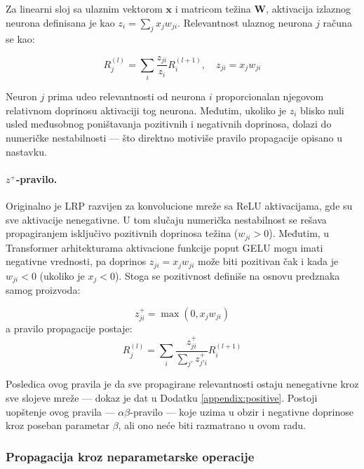 Za linearni sloj sa ulaznim vektorom $\mathbf{x}$ i matricom težina $\mathbf{W}$, 
aktivacija izlaznog neurona definisana je kao $z_i = \sum_j x_j w_{ji}$. 
Relevantnost ulaznog neurona $j$ računa se kao:

\begin{equation}
    R_j^{(l)} = \sum_i \frac{z_{ji}}{z_i} R_i^{(l+1)}, \quad z_{ji} = x_j w_{ji}
    \label{eq:lrp_basic}
\end{equation}

Neuron $j$ prima udeo relevantnosti od neurona $i$ proporcionalan njegovom 
relativnom doprinosu aktivaciji tog neurona. Međutim, ukoliko je $z_i$ blisko 
nuli usled međusobnog poništavanja pozitivnih i negativnih doprinosa, dolazi do 
numeričke nestabilnosti — što direktno motiviše pravilo propagacije opisano u nastavku.

\paragraph{$z^+$-pravilo.} Originalno je LRP razvijen za konvolucione mreže sa 
ReLU aktivacijama, gde su sve aktivacije nenegativne. U tom slučaju numerička 
nestabilnost se rešava propagiranjem isključivo pozitivnih doprinosa težina 
($w_{ji} > 0$). Međutim, u Transformer arhitekturama aktivacione funkcije 
poput GELU mogu imati negativne vrednosti, pa doprinos $z_{ji} = x_j w_{ji}$ 
može biti pozitivan čak i kada je $w_{ji} < 0$ (ukoliko je $x_j < 0$). Stoga 
se pozitivnost definiše na osnovu predznaka samog proizvoda:

\begin{equation}
    z_{ji}^+ = \max(0, x_j w_{ji})
\end{equation}
a pravilo propagacije postaje:
\begin{equation}
    R_j^{(l)} = \sum_i \frac{z_{ji}^+}{\sum_{j'} z_{j'i}^+} R_i^{(l+1)}
    \label{eq:zplus}
\end{equation}

Posledica ovog pravila je da sve propagirane relevantnosti ostaju nenegativne 
kroz sve slojeve mreže — dokaz je dat u Dodatku \ref{appendix:positive}. 
Postoji uopštenje ovog pravila — $\alpha\beta$-pravilo — koje uzima u obzir 
i negativne doprinose kroz poseban parametar $\beta$, ali ono neće biti 
razmatrano u ovom radu.

\subsubsection{Propagacija kroz neparametarske operacije}

